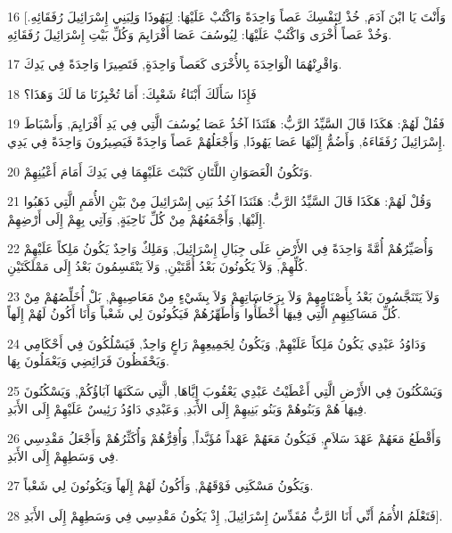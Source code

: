 \par 16 [وَأَنْتَ يَا ابْنَ آدَمَ, خُذْ لِنَفْسِكَ عَصاً وَاحِدَةً وَاكْتُبْ عَلَيْهَا: لِيَهُوذَا وَلِبَنِي إِسْرَائِيلَ رُفَقَائِهِ. وَخُذْ عَصاً أُخْرَى وَاكْتُبْ عَلَيْهَا: لِيُوسُفَ عَصَا أَفْرَايِمَ وَكُلِّ بَيْتِ إِسْرَائِيلَ رُفَقَائِهِ.
\par 17 وَاقْرِنْهُمَا الْوَاحِدَةَ بِالأُخْرَى كَعَصاً وَاحِدَةٍ, فَتَصِيرَا وَاحِدَةً فِي يَدِكَ.
\par 18 فَإِذَا سَأَلَكَ أَبْنَاءُ شَعْبِكَ: أَمَا تُخْبِرُنَا مَا لَكَ وَهَذَا؟
\par 19 فَقُلْ لَهُمْ: هَكَذَا قَالَ السَّيِّدُ الرَّبُّ: هَئَنَذَا آخُذُ عَصَا يُوسُفَ الَّتِي فِي يَدِ أَفْرَايِمَ, وَأَسْبَاطَ إِسْرَائِيلَ رُفَقَاءَهُ, وَأَضُمُّ إِلَيْهَا عَصَا يَهُوذَا, وَأَجْعَلُهُمْ عَصاً وَاحِدَةً فَيَصِيرُونَ وَاحِدَةً فِي يَدِي.
\par 20 وَتَكُونُ الْعَصَوَانِ اللَّتَانِ كَتَبْتَ عَلَيْهِمَا فِي يَدِكَ أَمَامَ أَعْيُنِهِمْ.
\par 21 وَقُلْ لَهُمْ: هَكَذَا قَالَ السَّيِّدُ الرَّبُّ: هَئَنَذَا آخُذُ بَنِي إِسْرَائِيلَ مِنْ بَيْنِ الأُمَمِ الَّتِي ذَهَبُوا إِلَيْهَا, وَأَجْمَعُهُمْ مِنْ كُلِّ نَاحِيَةٍ, وَآتِي بِهِمْ إِلَى أَرْضِهِمْ.
\par 22 وَأُصَيِّرُهُمْ أُمَّةً وَاحِدَةً فِي الأَرْضِ عَلَى جِبَالِ إِسْرَائِيلَ, وَمَلِكٌ وَاحِدٌ يَكُونُ مَلِكاً عَلَيْهِمْ كُلِّهِمْ, وَلاَ يَكُونُونَ بَعْدُ أُمَّتَيْنِ, وَلاَ يَنْقَسِمُونَ بَعْدُ إِلَى مَمْلَكَتَيْنِ.
\par 23 وَلاَ يَتَنَجَّسُونَ بَعْدُ بِأَصْنَامِهِمْ وَلاَ بِرَجَاسَاتِهِمْ وَلاَ بِشَيْءٍ مِنْ مَعَاصِيهِمْ, بَلْ أُخَلِّصُهُمْ مِنْ كُلِّ مَسَاكِنِهِمِ الَّتِي فِيهَا أَخْطَأُوا وَأُطَهِّرُهُمْ فَيَكُونُونَ لِي شَعْباً وَأَنَا أَكُونُ لَهُمْ إِلَهاً.
\par 24 وَدَاوُدُ عَبْدِي يَكُونُ مَلِكاً عَلَيْهِمْ, وَيَكُونُ لِجَمِيعِهِمْ رَاعٍ وَاحِدٌ, فَيَسْلُكُونَ فِي أَحْكَامِي وَيَحْفَظُونَ فَرَائِضِي وَيَعْمَلُونَ بِهَا.
\par 25 وَيَسْكُنُونَ فِي الأَرْضِ الَّتِي أَعْطَيْتُ عَبْدِي يَعْقُوبَ إِيَّاهَا, الَّتِي سَكَنَهَا آبَاؤُكُمْ, وَيَسْكُنُونَ فِيهَا هُمْ وَبَنُوهُمْ وَبَنُو بَنِيهِمْ إِلَى الأَبَدِ, وَعَبْدِي دَاوُدُ رَئِيسٌ عَلَيْهِمْ إِلَى الأَبَدِ.
\par 26 وَأَقْطَعُ مَعَهُمْ عَهْدَ سَلاَمٍ, فَيَكُونُ مَعَهُمْ عَهْداً مُؤَبَّداً, وَأُقِرُّهُمْ وَأُكَثِّرُهُمْ وَأَجْعَلُ مَقْدِسِي فِي وَسَطِهِمْ إِلَى الأَبَدِ.
\par 27 وَيَكُونُ مَسْكَنِي فَوْقَهُمْ, وَأَكُونُ لَهُمْ إِلَهاً وَيَكُونُونَ لِي شَعْباً.
\par 28 فَتَعْلَمُ الأُمَمُ أَنِّي أَنَا الرَّبُّ مُقَدِّسُ إِسْرَائِيلَ, إِذْ يَكُونُ مَقْدِسِي فِي وَسَطِهِمْ إِلَى الأَبَدِ].

